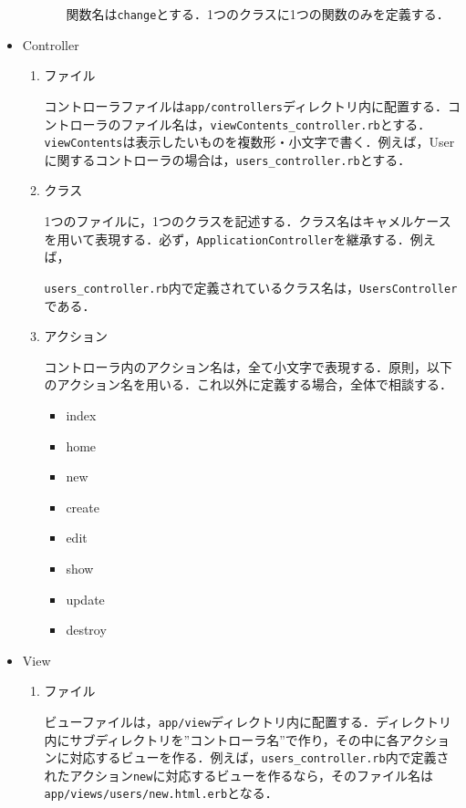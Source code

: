 \begin{itemize}
\begin{enumerate}
\begin{enumerate}
            関数名は\texttt{change}とする．1つのクラスに1つの関数のみを定義する．
        \end{enumerate}
    \end{enumerate}
    
    \item Controller
    \begin{enumerate}
        \item ファイル

        コントローラファイルは\texttt{app/controllers}ディレクトリ内に配置する．コントローラのファイル名は，\texttt{viewContents\_controller.rb}とする．\texttt{viewContents}は表示したいものを複数形・小文字で書く．例えば，Userに関するコントローラの場合は，\texttt{users\_controller.rb}とする．
        \item クラス

        1つのファイルに，1つのクラスを記述する．クラス名はキャメルケースを用いて表現する．必ず，\texttt{ApplicationController}を継承する．例えば，
        
        \texttt{users\_controller.rb}内で定義されているクラス名は，\texttt{UsersController}である．
        \item アクション

        コントローラ内のアクション名は，全て小文字で表現する．原則，以下のアクション名を用いる．これ以外に定義する場合，全体で相談する．
        \begin{itemize}
            \item index
            \item home
            \item new
            \item create
            \item edit
            \item show
            \item update
            \item destroy
        \end{itemize}
    \end{enumerate}
    \item View
    \begin{enumerate}
        \item ファイル

        ビューファイルは，\texttt{app/view}ディレクトリ内に配置する．ディレクトリ内にサブディレクトリを”コントローラ名”で作り，その中に各アクションに対応するビューを作る．例えば，\texttt{users\_controller.rb}内で定義されたアクション\texttt{new}に対応するビューを作るなら，そのファイル名は\texttt{app/views/users/new.html.erb}となる．
    \end{enumerate}
\end{itemize}

